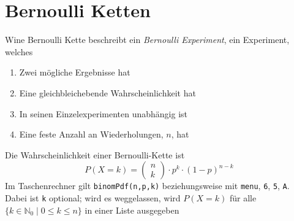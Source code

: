 \documentclass{article}
\begin{document}
\section{Bernoulli Ketten}
Wine Bernoulli Kette beschreibt ein \emph{Bernoulli Experiment}, ein Experiment, welches
\begin{enumerate}
 \item Zwei mögliche Ergebnisse hat
 \item Eine gleichbleichebende Wahrscheinlichkeit hat
 \item In seinen Einzelexperimenten unabhängig ist
 \item Eine feste Anzahl an Wiederholungen, $n$, hat 
\end{enumerate} 
Die Wahrscheinlichkeit einer Bernoulli-Kette ist
\[
 P(X=k) =
 \begin{pmatrix} n \\ k \end{pmatrix} \cdot
  p^k \cdot (1-p)^{n-k}
\]
Im Taschenrechner gilt \texttt{binomPdf(n,p,k)} beziehungsweise mit \texttt{menu}, \texttt{6}, \texttt{5}, \texttt{A}. Dabei ist \texttt{k} optional; wird es weggelassen, wird $P(X=k)$ für alle $\{k \in \mathbb{N}_0 \mid 0 \leq k \leq n\}$ in einer Liste ausgegeben
\end{document}
